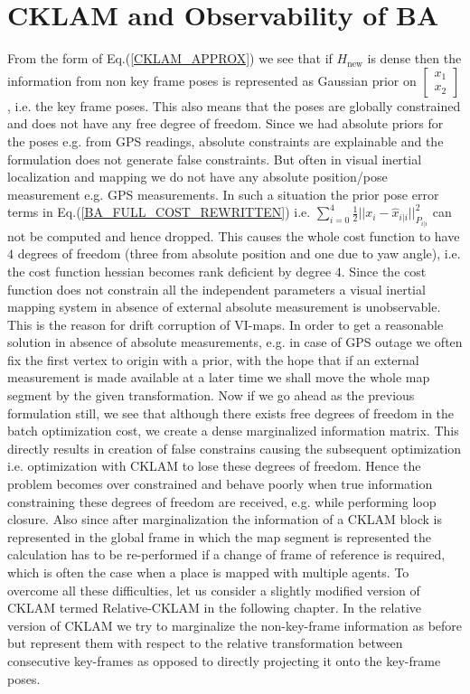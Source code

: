 \section{CKLAM and Observability of BA}
\label{cklamObservability}
From the form of Eq.(\ref{CKLAM_APPROX}) we see that if $H_\mathrm{new}$ is dense then the information from non key frame poses is represented as Gaussian prior on $\begin{bmatrix} x_{1} \\ x_{2} \end{bmatrix}$, i.e. the key frame poses. This also means that the poses are globally constrained and does not have any free degree of freedom. Since we had absolute priors for the poses e.g. from GPS readings, absolute constraints are explainable and the formulation does not generate false constraints. But often in visual inertial localization and mapping we do not have any absolute position/pose measurement e.g. GPS measurements. In such a situation the prior pose error terms in Eq.(\ref{BA_FULL_COST_REWRITTEN}) i.e. $\sum_{i=0}^4 \frac{1}{2}||x_i-\hat x_{i|i}||^2_{P_{i|i}}$ can not be computed and hence dropped. This causes the whole cost function to have $4$ degrees of freedom (three from absolute position and one due to yaw angle), i.e. the cost function hessian becomes rank deficient by degree $4$. Since the cost function does not constrain all the independent parameters a visual inertial mapping system in absence of external absolute measurement is unobservable. This is the reason for drift corruption of VI-maps. In order to get a reasonable solution in absence of absolute measurements, e.g. in case of GPS outage we often fix the first vertex to origin with a prior, with the hope that if an external measurement is made available at a later time we shall move the whole map segment by the given transformation. Now if we go ahead as the previous formulation still, we see that although there exists free degrees of freedom in the batch optimization cost, we create a dense marginalized information matrix. This directly results in creation of false constrains causing the subsequent optimization i.e. optimization with CKLAM to lose these degrees of freedom. Hence the problem becomes over constrained and behave poorly when true information constraining these degrees of freedom are received, e.g. while performing loop closure. Also since after marginalization the information of a CKLAM block is represented in the global frame in which the map segment is represented the calculation has to be re-performed if a change of frame of reference is required, which is often the case when a place is mapped with multiple agents. To overcome all these difficulties, let us consider a slightly modified version of CKLAM termed Relative-CKLAM in the following chapter. In the relative version of CKLAM we try to marginalize the non-key-frame information as before but represent them with respect to the relative transformation between consecutive key-frames as opposed to directly projecting it onto the key-frame poses.

